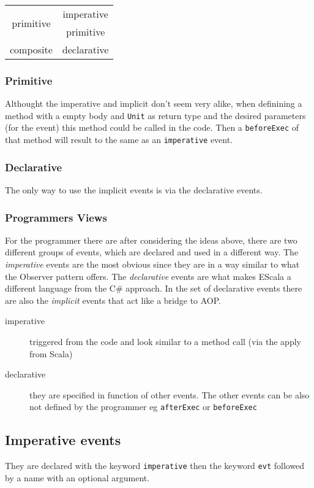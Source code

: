 \documentclass{article}
\newcommand{\escala}[0]{EScala }
\begin{document}
\begin{tabular}{|c|c|}
\hline
\multirow{2}{*}{primitive}  & imperative \\
                            & primitive  \\
\hline
composite  & declarative \\
\hline
\end{tabular}

\subsubsection{Primitive}
Althought the imperative and implicit don't seem very alike, when
definining a method with a empty body and {\tt Unit} as return type
and the desired parameters (for the event) this method could be called 
in the code. Then a {\tt beforeExec} of that method will result to 
the same as an {\tt imperative} event.

\subsubsection{Declarative}
The only way to use the implicit events is via the declarative events.

\subsubsection{Programmers Views}
For the programmer there are after considering the ideas above, there
are two different groups of  events, which are declared and
used in a different way. The \emph{imperative} events are the most 
obvious since they are in a way similar to what the Observer pattern
offers. The \emph{declarative} events are what makes \escala a different
language from the C\# approach. In the set of declarative events there are also the 
\emph{implicit} events that act like a bridge to AOP.

\begin{description}
\item [imperative] triggered from the code and look similar to a method call (via the apply from Scala)
\item [declarative] they are specified in function of other events. The other events can be also not defined by the programmer eg {\tt afterExec} or {\tt beforeExec}
\end{description}

\subsection{Imperative events}
They are declared with the keyword {\tt imperative} then the keyword 
{\tt evt} followed by a name with an optional argument.
\end{document}
